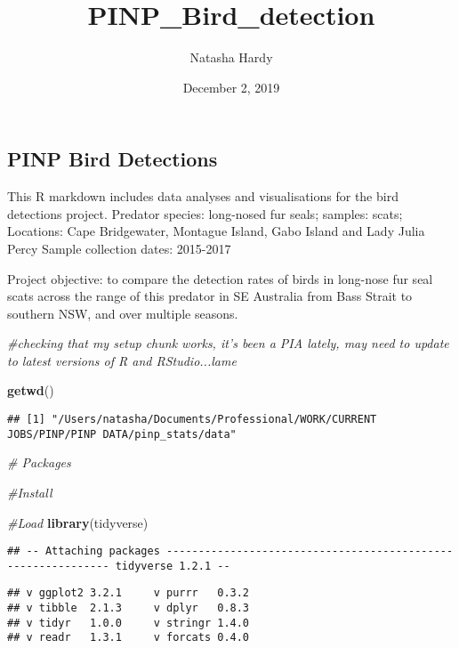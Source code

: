 \documentclass[]{article}
\title{PINP\_Bird\_detection}
\author{Natasha Hardy}
\date{December 2, 2019}
\newenvironment{Shaded}{\begin{snugshade}}{\end{snugshade}}
\newcommand{\KeywordTok}[1]{\textcolor[rgb]{0.13,0.29,0.53}{\textbf{#1}}}
\newcommand{\CommentTok}[1]{\textcolor[rgb]{0.56,0.35,0.01}{\textit{#1}}}
\newcommand{\NormalTok}[1]{#1}
\begin{document}
\maketitle

\subsection{PINP Bird Detections}\label{pinp-bird-detections}

This R markdown includes data analyses and visualisations for the bird
detections project. Predator species: long-nosed fur seals; samples:
scats; Locations: Cape Bridgewater, Montague Island, Gabo Island and
Lady Julia Percy Sample collection dates: 2015-2017

Project objective: to compare the detection rates of birds in long-nose
fur seal scats across the range of this predator in SE Australia from
Bass Strait to southern NSW, and over multiple seasons.

\begin{Shaded}
\begin{Highlighting}[]
\CommentTok{#checking that my setup chunk works, it's been a PIA lately, may need to update to latest versions of R and RStudio...lame}

\KeywordTok{getwd}\NormalTok{()}
\end{Highlighting}
\end{Shaded}

\begin{verbatim}
## [1] "/Users/natasha/Documents/Professional/WORK/CURRENT JOBS/PINP/PINP DATA/pinp_stats/data"
\end{verbatim}

\begin{Shaded}
\begin{Highlighting}[]
\CommentTok{# Packages}

\CommentTok{#Install}

\CommentTok{#Load}
\KeywordTok{library}\NormalTok{(tidyverse)}
\end{Highlighting}
\end{Shaded}

\begin{verbatim}
## -- Attaching packages ------------------------------------------------------------- tidyverse 1.2.1 --
\end{verbatim}

\begin{verbatim}
## v ggplot2 3.2.1     v purrr   0.3.2
## v tibble  2.1.3     v dplyr   0.8.3
## v tidyr   1.0.0     v stringr 1.4.0
## v readr   1.3.1     v forcats 0.4.0
\end{verbatim}
\end{document}
